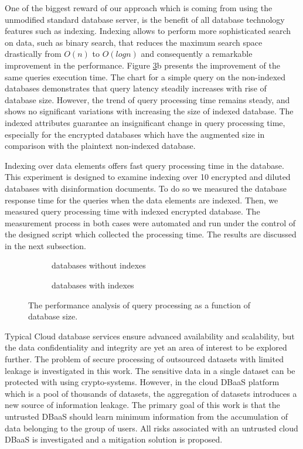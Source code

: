 One of the biggest reward of our approach which is coming from using the unmodified standard database server, is the benefit of all database technology features such as indexing. Indexing allows to perform more sophisticated search on data, such as binary search, that reduces the maximum search space drastically from $O(n)$ to $O(log n)$ and consequently a remarkable improvement in the performance. Figure \ref{queryLatencyToSize}b presents the improvement of the same queries execution time. The chart for a simple query on the non-indexed databases demonstrates that query latency steadily increases with rise of database size. However, the trend of query processing time remains steady, and shows no significant variations with increasing the size of indexed database. The indexed attributes guarantee an insignificant change in query processing time, especially for the encrypted databases which have the augmented size in comparison with the plaintext non-indexed database.

Indexing over data elements offers fast query processing time in the database. This experiment is designed to examine indexing over 10 encrypted and diluted databases with disinformation documents. To do so we measured the database response time for the queries when the data elements are indexed. Then, we measured query processing time with indexed encrypted database. The measurement process in both cases were automated and run under the control of the designed script which collected the processing time. The results are discussed in the next subsection.

\begin{figure}[H]
\begin{subfigure}{0.40\textwidth}
\centering
\resizebox{0.9\totalheight}{!}{}
\label{fig:LatencyVsSize}
\caption{databases without indexes }
\end{subfigure}
\qquad \qquad
\begin{subfigure}{0.40\textwidth}
\resizebox{0.9\totalheight}{!}{}
\label{fig:LatencyWithIndexedDB}
\caption{databases with indexes}
\end{subfigure}
\caption{The performance analysis of query processing as a function of database size. }
\label{queryLatencyToSize}
\end{figure}

\medskip

 Typical Cloud database services ensure advanced availability and scalability, but the data confidentiality and integrity are yet an area of interest to be explored further. The problem of secure processing of outsourced datasets with limited leakage is investigated in this work. The sensitive data in a single dataset can be protected with using crypto-systems. However, in the cloud DBaaS platform which is a pool of thousands of datasets, the aggregation of datasets introduces a new source of information leakage. The primary goal of this work is that the untrusted DBaaS should learn minimum information from the accumulation of data belonging to the group of users. All risks associated with an untrusted cloud DBaaS is investigated and a mitigation solution is proposed. 

